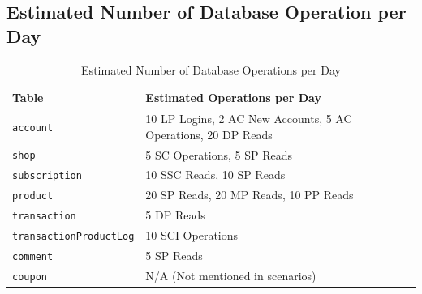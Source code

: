 \documentclass[a4paper, 12pt]{article}
\begin{document}
\subsection{Estimated Number of Database Operation per Day}
\begin{table}[h]
    \begin{tabular}{|p{5cm}|p{7cm}|}
        \hline
        \textbf{Table} & \textbf{Estimated Operations per Day} \\
        \hline
        \texttt{account} & 10 LP Logins, 2 AC New Accounts, 5 AC Operations, 20 DP Reads \\
        \hline
        \texttt{shop} & 5 SC Operations, 5 SP Reads \\
        \hline
        \texttt{subscription} & 10 SSC Reads, 10 SP Reads \\
        \hline
        \texttt{product} & 20 SP Reads, 20 MP Reads, 10 PP Reads \\
        \hline
        \texttt{transaction} & 5 DP Reads \\
        \hline
        \texttt{transactionProductLog} & 10 SCI Operations \\
        \hline
        \texttt{comment} & 5 SP Reads \\
        \hline
        \texttt{coupon} & N/A (Not mentioned in scenarios) \\
        \hline
    \end{tabular}
    \caption{Estimated Number of Database Operations per Day}
    \label{tab:estimated-database-operations}
\end{table}
\newpage
\end{document}
